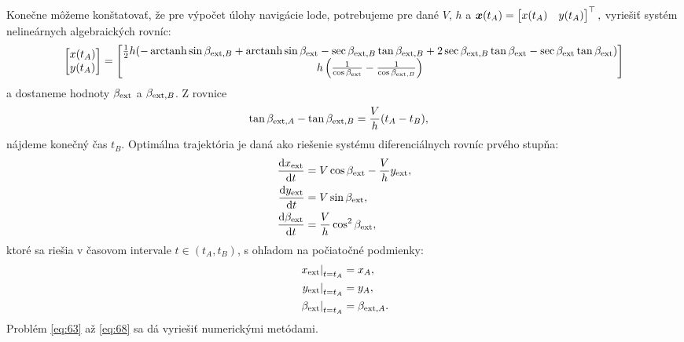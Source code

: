 \documentclass[reqno, a4paper]{amsart}
\numberwithin{equation}{section}
\begin{document}
Konečne môžeme konštatovať, že pre výpočet úlohy navigácie lode, potrebujeme pre dané $V$, $h$ a 
$\bm{x}(t_{A})= \begin{bmatrix}
    x(t_{A}) &
    y(t_{A})
  \end{bmatrix}
^\top,
$
vyriešiť systém nelineárnych algebraických rovníc:
\begin{align}
 \label{eq:63}
\begin{bmatrix}
x(t_{A})\\
y(t_{A})
\end{bmatrix}
=
\begin{bmatrix}
    \frac{1}{2}h(-\operatorname{arctanh} \sin 	       \beta_{\mathrm{ext},B} + \operatorname{arctanh} \sin \beta_{\mathrm{ext}} - \sec \beta_{\mathrm{ext},B} \tan \beta_{\mathrm{ext},B} + 2\sec \beta_{\mathrm{ext},B} \tan \beta_{\mathrm{ext}} - \sec \beta_{\mathrm{ext}} \tan \beta_{\mathrm{ext}}) \\
    h\left(\frac{1}{\cos \beta_{\mathrm{ext}}}-\frac{1}{\cos \beta_{\mathrm{ext},B}}\right)
  \end{bmatrix}
\end{align}
a dostaneme hodnoty $\beta_{\mathrm{ext}}$ a $\beta_{\mathrm{ext},B}$. Z rovnice 
\begin{align}
\tan \beta_{\mathrm{ext},A} - \tan \beta_{\mathrm{ext}, B} &= \frac{V}{h}(t_{A}-t_{B}),
\end{align}
nájdeme konečný čas $t_{B}$. Optimálna trajektória je daná ako riešenie systému diferenciálnych rovníc prvého stupňa:
\begin{subequations}
 \label{eq:64}
 \begin{align}
  \label{eq:65}
  \frac{\mathrm{d} {x_{\mathrm{ext}}}}{\mathrm{d} {t}} &= V \cos \beta_{\mathrm{ext}} - \frac{V}{h}y_{\mathrm{ext}},  \\
  \label{eq:66}
  \frac{\mathrm{d} {y_{\mathrm{ext}}}}{\mathrm{d} {t}} &= V \sin \beta_{\mathrm{ext}},  \\
  \label{eq:67}
  \frac{\mathrm{d} {\beta_{\mathrm{ext}}}}{\mathrm{d} {t}}
                              &=
  \frac{V}{h}  \cos^2 \beta_{\mathrm{ext}}, 
 \end{align}
\end{subequations}
ktoré sa riešia v časovom intervale $t \in (t_{A}, t_{B})$, s ohľadom na počiatočné podmienky:
\begin{subequations}
 \label{eq:68}
 \begin{align}
  \label{eq:69}
  \left. x_{\mathrm{ext}} \right|_{t=t_{A}} &= x_{A},  \\
  \label{eq:70}
  \left. y_{\mathrm{ext}} \right|_{t=t_{A}} &= y_{A},   \\
  \label{eq:71}
  \left. \beta_{\mathrm{ext}} \right|_{t=t_{A}} &= \beta_{\mathrm{ext}, A}. 
 \end{align}
\end{subequations}
Problém \ref{eq:63} až \ref{eq:68} sa dá vyriešiť numerickými metódami.
\end{document}
